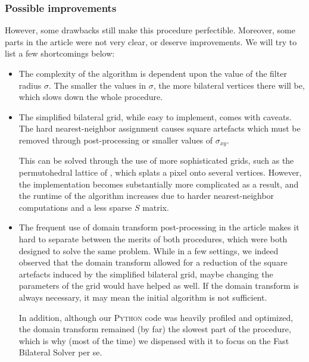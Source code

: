 \documentclass{article}
\begin{document}
\subsubsection{Possible improvements}

However, some drawbacks still make this procedure perfectible. Moreover, some parts in the article were not very clear, or deserve improvements. We will try to list a few shortcomings below:

\begin{itemize}
    \item The complexity of the algorithm is dependent upon the value of the filter radius $\sigma$. The smaller the values in $\sigma$, the more bilateral vertices there will be, which slows down the whole procedure.
    
    \item The simplified bilateral grid, while easy to implement, comes with caveats. The hard nearest-neighbor assignment causes square artefacts which must be removed through post-processing or smaller values of $\sigma_{xy}$.
    
    This can be solved through the use of more sophisticated grids, such as the permutohedral lattice of \cite{adams_fast_2010}, which splats a pixel onto several vertices. However, the implementation becomes substantially more complicated as a result, and the runtime of the algorithm increases due to harder nearest-neighbor computations and a less sparse $S$ matrix.
    
    \item The frequent use of domain transform post-processing in the article makes it hard to separate between the merits of both procedures, which were both designed to solve the same problem. While in a few settings, we indeed observed that the domain transform allowed for a reduction of the square artefacts induced by the simplified bilateral grid, maybe changing the parameters of the grid would have helped as well. If the domain transform is always necessary, it may mean the initial algorithm is not sufficient.
    
    In addition, although our \textsc{Python} code was heavily profiled and optimized, the domain transform remained (by far) the slowest part of the procedure, which is why (most of the time) we dispensed with it to focus on the Fast Bilateral Solver per se.
\end{itemize}

\newpage



\end{document}
